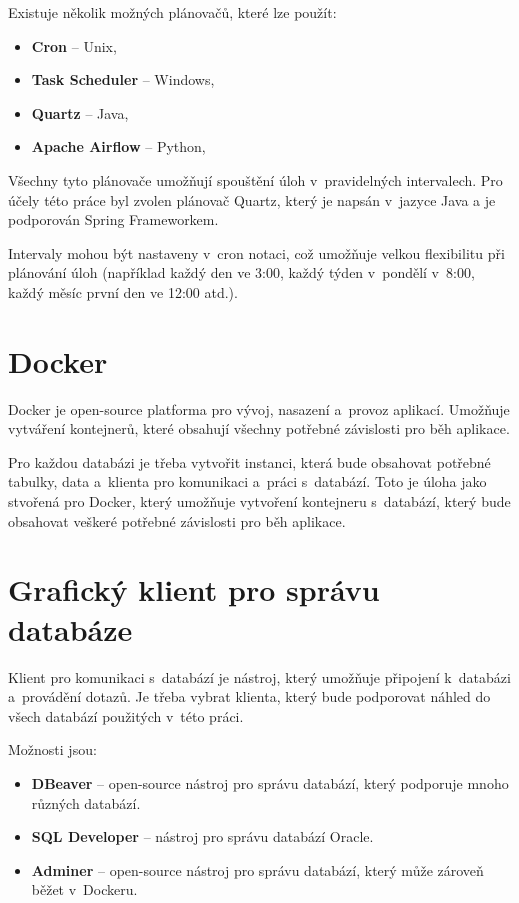 Existuje několik možných plánovačů, které lze použít:
\begin{itemize}
    \item \textbf{Cron} -- Unix,
    \item \textbf{Task Scheduler} -- Windows,
    \item \textbf{Quartz} -- Java,
    \item \textbf{Apache Airflow} -- Python,
\end{itemize}

Všechny tyto plánovače umožňují spouštění úloh v~pravidelných intervalech.  
Pro účely této práce byl zvolen plánovač Quartz, který je napsán v~jazyce Java a  
je podporován Spring Frameworkem.  

Intervaly mohou být nastaveny v~cron notaci, což umožňuje velkou flexibilitu při plánování úloh  
(například každý den ve 3:00, každý týden v~pondělí v~8:00, každý měsíc první den ve 12:00 atd.).

\section{Docker}
Docker je open-source platforma pro vývoj, nasazení a~provoz aplikací.  
Umožňuje vytváření kontejnerů, které obsahují všechny potřebné závislosti pro běh aplikace.  

Pro každou databázi je třeba vytvořit instanci, která bude obsahovat potřebné tabulky, data  
a~klienta pro komunikaci a~práci s~databází. Toto je úloha jako stvořená pro Docker,  
který umožňuje vytvoření kontejneru s~databází, který bude obsahovat veškeré potřebné závislosti  
pro běh aplikace.  
\cite{docker}

\newpage

\section{Grafický klient pro správu databáze}
Klient pro komunikaci s~databází je nástroj, který umožňuje připojení k~databázi a~provádění dotazů.  
Je třeba vybrat klienta, který bude podporovat náhled do všech databází použitých v~této práci.

Možnosti jsou:
\begin{itemize}
    \item \textbf{DBeaver} -- open-source nástroj pro správu databází, který podporuje mnoho různých databází.
    \item \textbf{SQL Developer} -- nástroj pro správu databází Oracle.
    \item \textbf{Adminer} -- open-source nástroj pro správu databází, který může zároveň běžet v~Dockeru.
\end{itemize}

